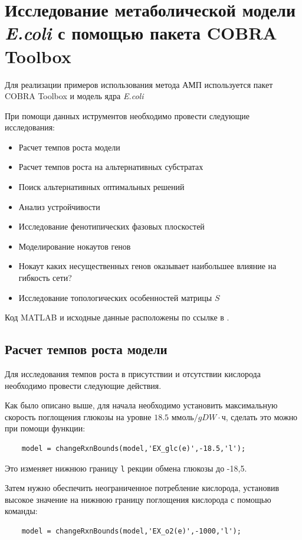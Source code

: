 \documentclass[a4paper, 12pt]{article}
\begin{document}
\section{Исследование метаболической модели \textit{E.coli} с помощью пакета COBRA Toolbox}

Для реализации примеров использования метода АМП используется пакет COBRA Toolbox \cite{litlink1}  и модель ядра \textit{E.coli} \cite{litlink2}

При помощи данных иструментов необходимо провести следующие исследования:
\begin{itemize}
    \item Расчет темпов роста модели
    \item Расчет темпов роста на альтернативных субстратах
    \item Поиск альтернативных оптимальных решений
    \item Анализ устройчивости
    \item Исследование фенотипических фазовых плоскостей
    \item Моделирование нокаутов генов
    \item Нокаут каких несущественных генов оказывает наибольшее влияние на гибкость сети?
    \item Исследование топологических особенностей матрицы $S$
\end{itemize}

Код MATLAB и исходные данные расположены по ссылке в .

\subsection{Расчет темпов роста модели}

Для исследования темпов роста в присутствии и отсутствии кислорода необходимо провести следующие действия. 

Как было описано выше, для начала необходимо установить максимальную скорость поглощения глюкозы на уровне $18.5$ $\textrm{ммоль} / gDW \cdot \textrm{ч}$, сделать это можно при помощи функции:
\begin{lstlisting}
    model = changeRxnBounds(model,'EX_glc(e)',-18.5,'l');
\end{lstlisting}
Это изменяет нижнюю границу \texttt{l} рекции обмена глюкозы до -18,5.  

Затем нужно обеспечить неограниченное потребление кислорода, установив высокое значение на нижнюю границу поглощения кислорода с помощью команды:
\begin{lstlisting}
    model = changeRxnBounds(model,'EX_o2(e)',-1000,'l');
\end{lstlisting}
\end{document}
